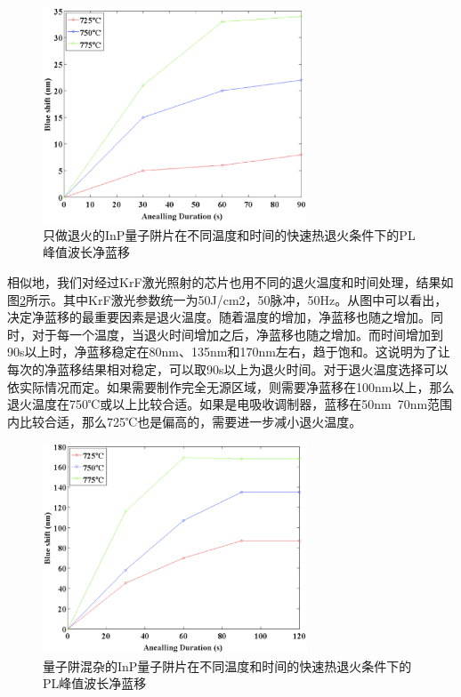 \documentclass{ZJUthesis}
\begin{document}
\begin{figure}[!t]
    \centering
    \includegraphics[width=0.7\textwidth]{./Pictures/heat_stability_shift.eps}
    \caption{只做退火的InP量子阱片在不同温度和时间的快速热退火条件下的PL峰值波长净蓝移}
    \label{fig_heat_stability_shift}
\end{figure}

相似地，我们对经过KrF激光照射的芯片也用不同的退火温度和时间处理，结果如图\ref{fig_qwi_rta}所示。其中KrF激光参数统一为50J/cm2，50脉冲，50Hz。从图中可以看出，决定净蓝移的最重要因素是退火温度。随着温度的增加，净蓝移也随之增加。同时，对于每一个温度，当退火时间增加之后，净蓝移也随之增加。而时间增加到90s以上时，净蓝移稳定在80nm、135nm和170nm左右，趋于饱和。这说明为了让每次的净蓝移结果相对稳定，可以取90s以上为退火时间。对于退火温度选择可以依实际情况而定。如果需要制作完全无源区域，则需要净蓝移在100nm以上，那么退火温度在750℃或以上比较合适。如果是电吸收调制器，蓝移在50nm~70nm范围内比较合适，那么725℃也是偏高的，需要进一步减小退火温度。

\begin{figure}[!t]
    \centering
    \includegraphics[width=0.7\textwidth]{./Pictures/qwi_rta.eps}
    \caption{量子阱混杂的InP量子阱片在不同温度和时间的快速热退火条件下的PL峰值波长净蓝移}
    \label{fig_qwi_rta}
\end{figure}
\end{document}
